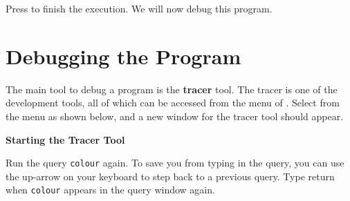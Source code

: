 Press  to finish the execution. We will now debug this program.

\section{Debugging the Program}


The main tool to debug a program is the {\bf tracer} tool. The tracer is
one of the development tools, all of which can be accessed from the  menu of
{\tkeclipse}. Select  from the
menu as shown below, and a new window for the tracer tool should appear.

\begin{center}

\vspace{3mm}
{\bf Starting the Tracer Tool}
\end{center}
Run the query \verb'colour' again. To save you from typing in the query,
you can use the up-arrow on your keyboard to step back to a previous query.
Type return when  \verb'colour' appears in the query window again.

